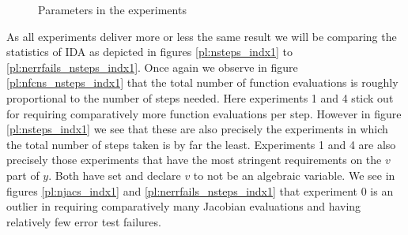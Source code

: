\documentclass{report}
\begin{document}
\begin{figure}[h]
\centering
{\footnotesize

}
\caption{Parameters in the experiments}
\label{tb:indx1_experiment_params}
\end{figure}

As all experiments deliver more or less the same result we will be comparing the statistics of IDA as depicted in figures \ref{pl:nsteps_indx1} to \ref{pl:nerrfails_nsteps_indx1}. Once again we observe in figure \ref{pl:nfcns_nsteps_indx1} that the total number of function evaluations is roughly proportional to the number of steps needed. Here experiments 1 and 4 stick out for requiring comparatively more function evaluations per step. However in figure \ref{pl:nsteps_indx1} we see that these are also precisely the experiments in which the total number of steps taken is by far the least. Experiments 1 and 4 are also precisely those experiments that have the most stringent requirements on the $v$ part of $y$. Both have set  and declare $v$ to not be an algebraic variable. We see in figures \ref{pl:njacs_indx1} and \ref{pl:nerrfails_nsteps_indx1} that experiment 0 is an outlier in requiring comparatively many Jacobian evaluations and having relatively few error test failures.
\end{document}
